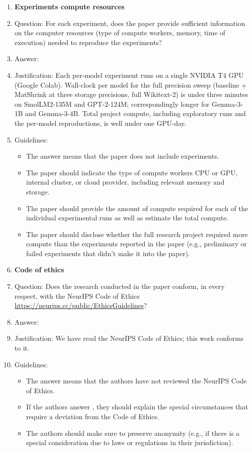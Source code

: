 \begin{enumerate}
\item {\bf Experiments compute resources}
    \item[] Question: For each experiment, does the paper provide sufficient information on the computer resources (type of compute workers, memory, time of execution) needed to reproduce the experiments?
    \item[] Answer: \answerYes{} %
    \item[] Justification: Each per-model experiment runs on a single NVIDIA T4 GPU (Google Colab). Wall-clock per model for the full precision sweep (baseline + MatShrink at three storage precisions, full Wikitext-2) is under three minutes on SmolLM2-135M and GPT-2-124M; correspondingly longer for Gemma-3-1B and Gemma-3-4B. Total project compute, including exploratory runs and the per-model reproductions, is well under one GPU-day.
    \item[] Guidelines:
    \begin{itemize}
        \item The answer \answerNA{} means that the paper does not include experiments.
        \item The paper should indicate the type of compute workers CPU or GPU, internal cluster, or cloud provider, including relevant memory and storage.
        \item The paper should provide the amount of compute required for each of the individual experimental runs as well as estimate the total compute.
        \item The paper should disclose whether the full research project required more compute than the experiments reported in the paper (e.g., preliminary or failed experiments that didn't make it into the paper).
    \end{itemize}

\item {\bf Code of ethics}
    \item[] Question: Does the research conducted in the paper conform, in every respect, with the NeurIPS Code of Ethics \url{https://neurips.cc/public/EthicsGuidelines}?
    \item[] Answer: \answerYes{} %
    \item[] Justification: We have read the NeurIPS Code of Ethics; this work conforms to it.
    \item[] Guidelines:
    \begin{itemize}
        \item The answer \answerNA{} means that the authors have not reviewed the NeurIPS Code of Ethics.
        \item If the authors answer \answerNo, they should explain the special circumstances that require a deviation from the Code of Ethics.
        \item The authors should make sure to preserve anonymity (e.g., if there is a special consideration due to laws or regulations in their jurisdiction).
    \end{itemize}


\end{enumerate}
